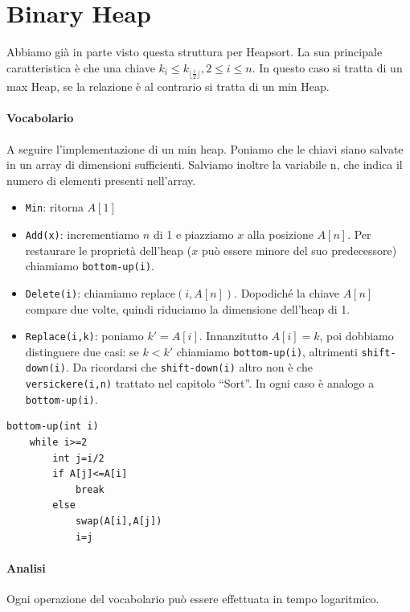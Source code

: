 \documentclass[a4paper]{book}
\newcommand{\inline}[1]{\lstinline!#1!}%
\newcommand{\lstIndent}{4}
\begin{document}
\section{Binary Heap}
Abbiamo già in parte visto questa struttura per Heapsort. La sua principale caratteristica è che una chiave $k_i \leq k_{\lfloor\frac{i}{2} \rfloor}, 2\leq i\leq n$. In questo caso si tratta di un max Heap, se la relazione è al contrario si tratta di un min Heap. 
\paragraph*{Vocabolario}
A seguire l'implementazione di un min heap. Poniamo che le chiavi siano salvate in un array di dimensioni sufficienti. Salviamo inoltre la variabile n, che indica il numero di elementi presenti nell'array.
\begin{itemize}
\item \inline{Min}: ritorna $A[1]$
\item \inline{Add(x)}: incrementiamo $n$ di 1 e piazziamo $x$ alla posizione $A[n]$. Per restaurare le proprietà dell'heap ($x$ può essere minore del suo predecessore) chiamiamo \inline{bottom-up(i)}.
\item \inline{Delete(i)}: chiamiamo replace$(i,A[n])$. Dopodiché la chiave $A[n]$ compare due volte, quindi riduciamo la dimensione dell'heap di 1. 
\item \inline{Replace(i,k)}: poniamo $k'=A[i]$. Innanzitutto $A[i]=k$, poi dobbiamo distinguere due casi: se $k<k'$ chiamiamo \inline{bottom-up(i)}, altrimenti \inline{shift-down(i)}. Da ricordarsi che \inline{shift-down(i)} altro non è che \\\inline{versickere(i,n)} trattato nel capitolo ``Sort''. In ogni caso è analogo a \inline{bottom-up(i)}.
\end{itemize}
\begin{lstlisting}[tabsize=\lstIndent]
bottom-up(int i)
	while i>=2
		int j=i/2
		if A[j]<=A[i]
			break
		else
			swap(A[i],A[j])
			i=j	
\end{lstlisting}
\paragraph*{Analisi}
Ogni operazione del vocabolario può essere effettuata in tempo logaritmico.
\end{document}
